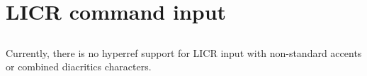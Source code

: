 \documentclass[a4paper]{article}
\begin{document}
\section{LICR command input}

\subsection{}
\subsection{\ensuregreek{0391
  \textAlpha
  \textBeta
  \textGamma
  \textDelta
  \textEpsilon
  \textZeta
  \textEta
  \textTheta
  \textIota
  \textKappa
  \textLambda
  \textMu
  \textNu
  \textXi
  \textOmicron
  \textPi
  \textRho
  \textSigma
  \textTau
  \textUpsilon
  \textPhi
  \textChi
  \textPsi
  \textOmega
}}
\subsection{}
\subsection{}
\subsection{}


Currently, there is no hyperref support for LICR input with non-standard
accents or combined diacritics characters.
\end{document}
